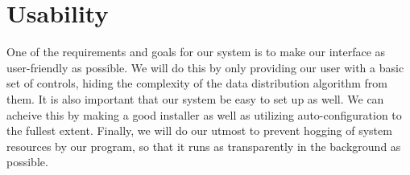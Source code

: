\section{Usability}
	One of the requirements and goals for our system is to make our interface as user-friendly as possible.  We will do this by only providing our user with a basic set of controls, hiding the complexity of the data distribution algorithm from them.  It is also important that our system be easy to set up as well.  We can acheive this by making a good installer as well as utilizing auto-configuration to the fullest extent.  Finally, we will do our utmost to prevent hogging of system resources by our program, so that it runs as transparently in the background as possible.